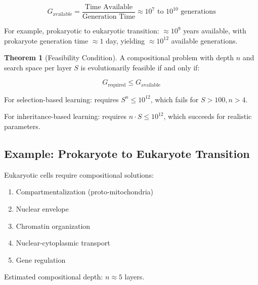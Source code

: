 \documentclass[11pt]{article}
\theoremstyle{definition}
\newtheorem{theorem}{Theorem}
\begin{document}
\begin{equation}
G_{\text{available}} = \frac{\text{Time Available}}{\text{Generation Time}} \approx 10^7 \text{ to } 10^{10} \text{ generations}
\end{equation}

For example, prokaryotic to eukaryotic transition: $\approx 10^9$ years available, with prokaryote generation time $\approx 1$ day, yielding $\approx 10^{12}$ available generations.

\begin{theorem}[Feasibility Condition]

A compositional problem with depth $n$ and search space per layer $S$ is evolutionarily feasible if and only if:

\begin{equation}
G_{\text{required}} \leq G_{\text{available}}
\end{equation}

For selection-based learning: requires $S^n \leq 10^{12}$, which fails for $S > 100, n > 4$.

For inheritance-based learning: requires $n \cdot S \leq 10^{12}$, which succeeds for realistic parameters.

\end{theorem}

\subsection{Example: Prokaryote to Eukaryote Transition}

Eukaryotic cells require compositional solutions:

\begin{enumerate}
\item Compartmentalization (proto-mitochondria)
\item Nuclear envelope
\item Chromatin organization
\item Nuclear-cytoplasmic transport
\item Gene regulation
\end{enumerate}

Estimated compositional depth: $n \approx 5$ layers.
\end{document}
